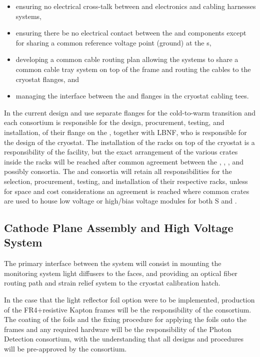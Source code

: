 \begin{itemize}
    \item ensuring no electrical cross-talk between  and  electronics and cabling harnesses systems,
    \item ensuring there be no electrical contact between the  and  components except for sharing a common reference voltage point (ground) at the \fdth{}s,  
    \item developing a common cable routing plan allowing the systems to share a common cable tray system on top of the  frame and routing the cables to the cryostat flanges, and 
    \item managing the interface between the  and  flanges in the cryostat cabling tees.
  \end{itemize}  
In the current design  and  use separate flanges for the cold-to-warm transition and each consortium is responsible for the design, procurement, testing, and installation, of their flange on the \fdth{}, together with LBNF, who is responsible for the design of the cryostat. 
The installation of the racks on top of the cryostat is a responsibility of the facility, but the exact arrangement of the various crates inside the racks will be reached after common agreement between the , , , and possibly  consortia. The  and  consortia will retain all responsibilities for the selection, procurement, testing, and installation of their respective racks, unless for space and cost considerations an agreement is reached where common crates are used to house low voltage or high/bias voltage modules for both S and . 


\subsection{Cathode Plane Assembly and High Voltage System}
\label{sec:fdsp-pd-intfc-le}


The primary interface between the  system will consist in mounting the  monitoring system light diffusers to the  faces, and providing an optical fiber routing path and strain relief system to the cryostat calibration hatch.



In the case that the light reflector foil option were to be implemented, production of the FR4+resistive Kapton  frames will be the responsibility of the  consortium.
The  coating of the  foils and the fixing procedure for applying the  foils onto the  frames and any required hardware will be the responsibility of the Photon Detection consortium, with the understanding that all designs and procedures will be pre-approved by the  consortium. 



